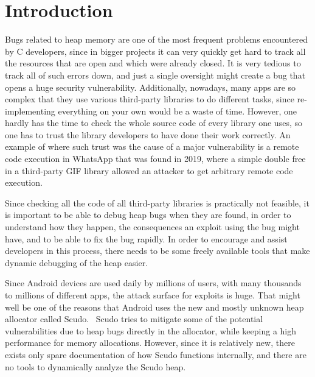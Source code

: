 \documentclass[a4paper,11pt,oneside]{report}
\begin{document}
\chapter{Introduction}


Bugs related to heap memory are one of the most frequent problems encountered
by C developers, since in bigger projects it can very quickly get hard to track
all the resources that are open and which were already closed. It is very tedious
to track all of such errors down, and just a single oversight might create a bug
that opens a huge security vulnerability. Additionally, nowadays, many apps are so
complex that they use various third-party libraries to do different tasks, since
re-implementing everything on your own would be a waste of time. However, one
hardly has the time to check the whole source code of every library one uses, so
one has to trust the library developers to have done their work correctly. An
example of where such trust was the cause of a major vulnerability is a remote
code execution in WhatsApp that was found in 2019, where a simple double free
in a third-party GIF library allowed an attacker to get arbitrary remote code
execution.~\cite{whatsappRCE}

Since checking all the code of all third-party libraries is practically not
feasible, it is important to be able to debug heap bugs when they are found, in
order to understand how they happen, the consequences an exploit using the
bug might have, and to be able to fix the bug rapidly. In order to encourage
and assist developers in this process, there needs to be some freely available
tools that make dynamic debugging of the heap easier.

Since Android devices are used daily by millions of users, with many thousands to
millions of different apps, the attack surface for exploits is huge. That might
well be one of the reasons that Android uses the new and mostly unknown heap
allocator called Scudo.~\cite{llvmScudo} Scudo tries to mitigate some of the potential
vulnerabilities due to heap bugs directly in the allocator, while keeping a high
performance for memory allocations. However, since it is relatively new, there
exists only spare documentation of how Scudo functions internally, and there
are no tools to dynamically analyze the Scudo heap.
\end{document}
